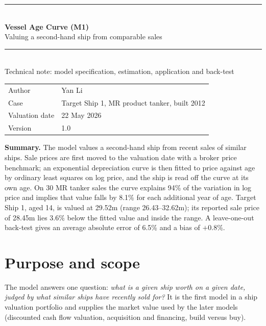 \documentclass[11pt,a4paper]{article}
\newcommand{\usd}[1]{\text{US\$}#1}
\begin{document}
\begin{titlepage}
\vspace*{3cm}
{\color{accent}\rule{\linewidth}{1pt}}\\[0.8em]
{\LARGE\bfseries Vessel Age Curve (M1)}\\[0.4em]
{\Large Valuing a second-hand ship from comparable sales}\\[0.6em]
{\color{accent}\rule{\linewidth}{1pt}}\\[1.5em]
{\large Technical note: model specification, estimation, application and back-test}\\[3em]

\begin{tabular}{@{}ll@{}}
Author & Yan Li \\
Case & Target Ship 1, MR product tanker, built 2012 \\
Valuation date & 22 May 2026 \\
Version & 1.0 \\
\end{tabular}

\vfill
\begin{minipage}{\linewidth}
\small
\textbf{Summary.}
The model values a second-hand ship from recent sales of similar ships. Sale prices are first moved to the valuation date with a broker price benchmark; an exponential depreciation curve is then fitted to price against age by ordinary least squares on log price, and the ship is read off the curve at its own age.
On 30 MR tanker sales the curve explains 94\% of the variation in log price and implies that value falls by 8.1\% for each additional year of age.
Target Ship 1, aged 14, is valued at \usd{29.52}m (range \usd{26.43}--32.62m); its reported sale price of \usd{28.45}m lies 3.6\% below the fitted value and inside the range.
A leave-one-out back-test gives an average absolute error of 6.5\% and a bias of $+0.8\%$.
\end{minipage}
\end{titlepage}

\tableofcontents
\newpage

\section{Purpose and scope}

The model answers one question: \emph{what is a given ship worth on a given date, judged by what similar ships have recently sold for?}
It is the first model in a ship valuation portfolio and supplies the market value used by the later models (discounted cash flow valuation, acquisition and financing, build versus buy).
\end{document}
